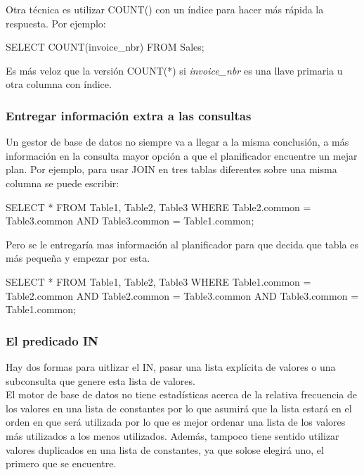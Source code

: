 Otra técnica es utilizar COUNT() con un índice para hacer más rápida la respuesta. Por ejemplo:\\

\begin{pyglist}
SELECT COUNT(invoice_nbr)
FROM Sales;
\end{pyglist}

Es más veloz que la versión COUNT(*) si \textit{invoice\_nbr} es una llave primaria u otra columna con índice.

\subsubsection{Entregar información extra a las consultas}

Un gestor de base de datos no siempre va a llegar a la misma conclusión, a más información en la consulta mayor opción a que el planificador encuentre un mejar plan. Por ejemplo, para usar JOIN en tres tablas diferentes sobre una misma columna se puede escribir:\\

\begin{pyglist}
SELECT *
  FROM Table1, Table2, Table3
 WHERE Table2.common = Table3.common
   AND Table3.common = Table1.common;
\end{pyglist}

Pero se le entregaría mas información al planificador para que decida que tabla es más pequeña y empezar por esta.\\

\begin{pyglist}
SELECT *
FROM Table1, Table2, Table3
WHERE Table1.common = Table2.common
AND Table2.common = Table3.common
AND Table3.common = Table1.common;
\end{pyglist}

\subsubsection{El predicado IN}

Hay dos formas para uitlizar el IN, pasar una lista explícita de valores o una subconsulta que genere esta lista de valores.\\

El motor de base de datos no tiene estadísticas acerca de la relativa frecuencia de los valores en una lista de constantes por lo que asumirá que la lista estará en el orden en que será utilizada por lo que es mejor ordenar una lista de los valores más utilizados a los menos utilizados. Además, tampoco tiene sentido utilizar valores duplicados en una lista de constantes, ya que solose elegirá uno, el primero que se encuentre.

